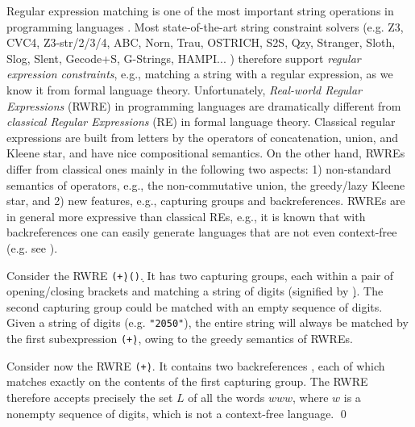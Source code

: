 Regular expression matching is one of the most important string operations
in programming languages \cite{Berkeley-JavaScript,BM17,LMK19,HAMPI}.
Most state-of-the-art string constraint solvers (e.g.
Z3, CVC4, Z3-str/2/3/4, ABC, Norn, Trau, OSTRICH, S2S, Qzy, Stranger, Sloth, Slog, Slent, Gecode+S, G-Strings, HAMPI... ) therefore support
 \emph{regular expression constraints}, e.g., matching a string with a 
regular expression, as we know it from formal language theory. Unfortunately, 
\emph{Real-world Regular Expressions} (RWRE) in programming languages are dramatically different from 
\emph{classical Regular Expressions} (RE) in formal language theory. 
Classical regular expressions are built from letters by the operators of
concatenation, union, and Kleene star, and have nice compositional semantics. On
the other hand, RWREs differ from classical ones mainly in the following two 
aspects: 1) non-standard semantics of 
operators, e.g., the non-commutative union, the greedy/lazy Kleene star, and 2) new 
features, e.g., capturing groups and backreferences.
RWREs are in general more expressive than classical REs, e.g., it is known that
with backreferences one can easily generate languages that are not even 
context-free (e.g. see \cite{FS19,Aho90,BM17b}). %
\begin{example}
    Consider the RWRE \texttt{(\d+)(\d*)}. It has two capturing
    groups, each within a pair of opening/closing brackets and  matching
    a string of digits (signified by \texttt{\d}). The second 
    capturing group
    could be matched with an empty sequence of digits. Given a string of digits
    (e.g. \texttt{"2050"}), the entire string will always be matched by the
    first subexpression \texttt{(\d+)}, owing to the greedy semantics of
    RWREs. 

    Consider now the RWRE \texttt{(\d+)\1\1}. It contains two
    backreferences \texttt{\1}, each of which
    matches exactly on the contents of the first capturing group. The RWRE therefore
    accepts precisely the set $L$ of all the words $www$, where $w$ is a 
    nonempty sequence of digits, which is not a context-free language.
    \qed
\end{example}


